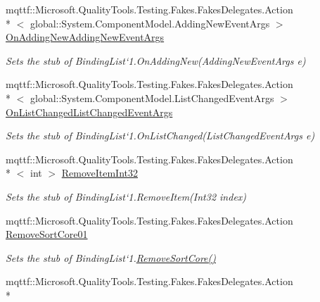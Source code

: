 \begin{DoxyCompactItemize}
mqttf\-::\-Microsoft.\-Quality\-Tools.\-Testing.\-Fakes.\-Fakes\-Delegates.\-Action\\*
$<$ global\-::\-System.\-Component\-Model.\-Adding\-New\-Event\-Args $>$ \hyperlink{class_system_1_1_component_model_1_1_fakes_1_1_stub_binding_list_3_01_t_01_4_a96e520a430ebc63ad28f131bbcf77b9e}{On\-Adding\-New\-Adding\-New\-Event\-Args}
\begin{DoxyCompactList}\small\item\em Sets the stub of Binding\-List`1.On\-Adding\-New(\-Adding\-New\-Event\-Args e)\end{DoxyCompactList}\item 
mqttf\-::\-Microsoft.\-Quality\-Tools.\-Testing.\-Fakes.\-Fakes\-Delegates.\-Action\\*
$<$ global\-::\-System.\-Component\-Model.\-List\-Changed\-Event\-Args $>$ \hyperlink{class_system_1_1_component_model_1_1_fakes_1_1_stub_binding_list_3_01_t_01_4_a9326ade90d849a3cc5e14dcaca034ec1}{On\-List\-Changed\-List\-Changed\-Event\-Args}
\begin{DoxyCompactList}\small\item\em Sets the stub of Binding\-List`1.On\-List\-Changed(\-List\-Changed\-Event\-Args e)\end{DoxyCompactList}\item 
mqttf\-::\-Microsoft.\-Quality\-Tools.\-Testing.\-Fakes.\-Fakes\-Delegates.\-Action\\*
$<$ int $>$ \hyperlink{class_system_1_1_component_model_1_1_fakes_1_1_stub_binding_list_3_01_t_01_4_a0ae4ea514a744ba36f4db9aa710d0f51}{Remove\-Item\-Int32}
\begin{DoxyCompactList}\small\item\em Sets the stub of Binding\-List`1.Remove\-Item(\-Int32 index)\end{DoxyCompactList}\item 
mqttf\-::\-Microsoft.\-Quality\-Tools.\-Testing.\-Fakes.\-Fakes\-Delegates.\-Action \hyperlink{class_system_1_1_component_model_1_1_fakes_1_1_stub_binding_list_3_01_t_01_4_a65b7586153f60a39a54251416e7b1cf1}{Remove\-Sort\-Core01}
\begin{DoxyCompactList}\small\item\em Sets the stub of Binding\-List`1.\hyperlink{class_system_1_1_component_model_1_1_fakes_1_1_stub_binding_list_3_01_t_01_4_a95ed368665465469cde4d803739c355b}{Remove\-Sort\-Core()}\end{DoxyCompactList}\item 
mqttf\-::\-Microsoft.\-Quality\-Tools.\-Testing.\-Fakes.\-Fakes\-Delegates.\-Action\\*

\end{DoxyCompactItemize}
